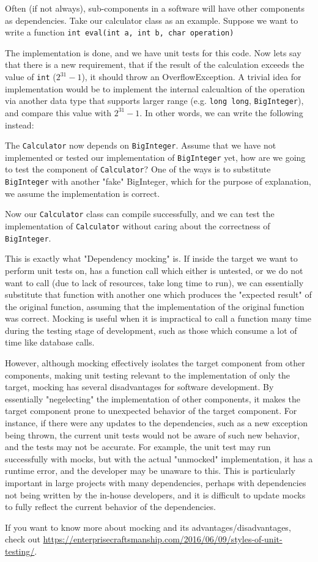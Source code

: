 Often (if not always), sub-components in a software will have other components as dependencies. Take our calculator class as an example. Suppose we want to write a function \texttt{int eval(int a, int b, char operation)}


The implementation is done, and we have unit tests for this code. Now lets say that there is a new requirement, that if the result of the calculation exceeds the value of \texttt{int} ($2^{31}-1$), it should throw an OverflowException. A trivial idea for implementation would be to implement the internal calcualtion of the operation via another data type that supports larger range (e.g. \texttt{long long}, \texttt{BigInteger}), and compare this value with $2^{31}-1$. In other words, we can write the following instead:


The \texttt{Calculator} now depends on \texttt{BigInteger}. Assume that we have not implemented or tested our implementation of \texttt{BigInteger} yet, how are we going to test the component of \texttt{Calculator}? One of the ways is to substitute \texttt{BigInteger} with another "fake" BigInteger, which for the purpose of explanation, we assume the implementation is correct.


Now our \texttt{Calculator} class can compile successfully, and we can test the implementation of \texttt{Calculator} without caring about the correctness of \texttt{BigInteger}. 

This is exactly what "Dependency mocking" is. If inside the target we want to perform unit tests on, has a function call which either is untested, or we do not want to call (due to lack of resources, take long time to run), we can essentially substitute that function with another one which produces the "expected result" of the original function, assuming that the implementation of the original function was correct. Mocking is useful when it is impractical to call a function many time during the testing stage of development, such as those which consume a lot of time like database calls. 

However, although mocking effectively isolates the target component from other components, making unit testing relevant to the implementation of only the target, mocking has several disadvantages for software development. By essentially "negelecting" the implementation of other components, it makes the target component prone to unexpected behavior of the target component. For instance, if there were any updates to the dependencies, such as a new exception being thrown, the current unit tests would not be aware of such new behavior, and the tests may not be accurate. For example, the unit test may run successfully with mocks, but with the actual "unmocked" implementation, it has a runtime error, and the developer may be unaware to this. This is particularly important in large projects with many dependencies, perhaps with dependencies not being written by the in-house developers, and it is difficult to update mocks to fully reflect the current behavior of the dependencies. 

If you want to know more about mocking and its advantages/disadvantages, check out \url{https://enterprisecraftsmanship.com/2016/06/09/styles-of-unit-testing/}. 
